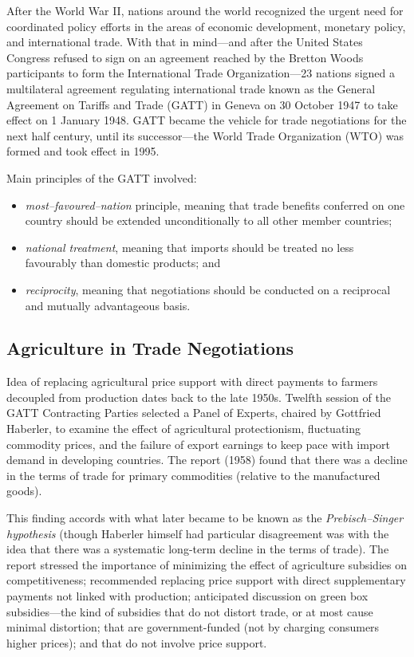 \documentclass[
]{book}
\providecommand{\tightlist}{%
  \setlength{\itemsep}{0pt}\setlength{\parskip}{0pt}}
\begin{document}
After the World War II, nations around the world recognized the urgent need for coordinated policy efforts in the areas of economic development, monetary policy, and international trade. With that in mind---and after the United States Congress refused to sign on an agreement reached by the Bretton Woods participants to form the International Trade Organization---23 nations signed a multilateral agreement regulating international trade known as the General Agreement on Tariffs and Trade (GATT) in Geneva on 30 October 1947 to take effect on 1 January 1948. GATT became the vehicle for trade negotiations for the next half century, until its successor---the World Trade Organization (WTO) was formed and took effect in 1995.

Main principles of the GATT involved:

\begin{itemize}
\tightlist
\item
  \emph{most--favoured--nation} principle, meaning that trade benefits conferred on one country should be extended unconditionally to all other member countries;
\item
  \emph{national treatment}, meaning that imports should be treated no less favourably than domestic products; and
\item
  \emph{reciprocity}, meaning that negotiations should be conducted on a reciprocal and mutually advantageous basis.
\end{itemize}

\hypertarget{agriculture-in-trade-negotiations}{%
\subsection{Agriculture in Trade Negotiations}\label{agriculture-in-trade-negotiations}}

Idea of replacing agricultural price support with direct payments to farmers decoupled from production dates back to the late 1950s. Twelfth session of the GATT Contracting Parties selected a Panel of Experts, chaired by Gottfried Haberler, to examine the effect of agricultural protectionism, fluctuating commodity prices, and the failure of export earnings to keep pace with import demand in developing countries. The report (1958) found that there was a decline in the terms of trade for primary commodities (relative to the manufactured goods).

This finding accords with what later became to be known as the \emph{Prebisch--Singer hypothesis} (though Haberler himself had particular disagreement was with the idea that there was a systematic long-term decline in the terms of trade). The report stressed the importance of minimizing the effect of agriculture subsidies on competitiveness; recommended replacing price support with direct supplementary payments not linked with production; anticipated discussion on green box subsidies---the kind of subsidies that do not distort trade, or at most cause minimal distortion; that are government-funded (not by charging consumers higher prices); and that do not involve price support.
\end{document}
